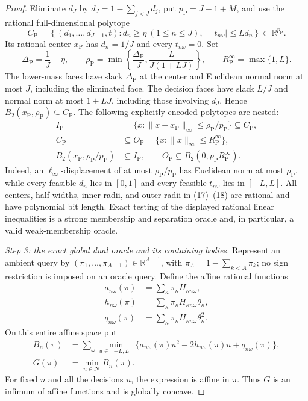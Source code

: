 \documentclass{article}
\begin{document}
\begin{proof}
Eliminate \(d_J\) by \(d_J=1-\sum_{j<J}d_j\), put \(p_{\mathrm P}=J-1+M\), and use the rational full-dimensional polytope
\[
 C_{\mathrm P}=\left\{(d_1,\ldots,d_{J-1},t):
 d_n\ge\eta\ (1\le n\le J),\quad
 |t_{n\omega}|\le Ld_n\right\}\subset\mathbb R^{p_{\mathrm P}}.
\tag{16}
\]
Its rational center \(x_{\mathrm P}\) has \(d_n=1/J\) and every \(t_{n\omega}=0\).  Set
\[
 \Delta_{\mathrm P}=\frac1J-\eta,
 \qquad
 \rho_{\mathrm P}=\min\left\{\frac{\Delta_{\mathrm P}}J,
                 \frac{L}{J(1+LJ)}\right\},
 \qquad R_{\mathrm P}^{\infty}=\max\{1,L\}.
\tag{17}
\]
The lower-mass faces have slack \(\Delta_{\mathrm P}\) at the center and Euclidean normal norm at most \(J\), including the eliminated face.  The decision faces have slack \(L/J\) and normal norm at most \(1+LJ\), including those involving \(d_J\).  Hence \(B_2(x_{\mathrm P},\rho_{\mathrm P})\subseteq C_{\mathrm P}\).  The following explicitly encoded polytopes are nested:
\[
 \begin{split}
 I_{\mathrm P}
   &=\{x:\|x-x_{\mathrm P}\|_\infty\le\rho_{\mathrm P}/p_{\mathrm P}\}
     \subseteq C_{\mathrm P},\\
 C_{\mathrm P}&\subseteq
 O_{\mathrm P}=\{x:\|x\|_\infty\le R_{\mathrm P}^{\infty}\},\\
 B_2(x_{\mathrm P},\rho_{\mathrm P}/p_{\mathrm P})
   &\subseteq I_{\mathrm P},
 \qquad
 O_{\mathrm P}\subseteq B_2(0,p_{\mathrm P}R_{\mathrm P}^{\infty}).
 \end{split}
\tag{18}
\]
Indeed, an \(\ell_\infty\)-displacement of at most \(\rho_{\mathrm P}/p_{\mathrm P}\) has Euclidean norm at most \(\rho_{\mathrm P}\), while every feasible \(d_n\) lies in \([0,1]\) and every feasible \(t_{n\omega}\) lies in \([-L,L]\).  All centers, half-widths, inner radii, and outer radii in (17)--(18) are rational and have polynomial bit length.  Exact testing of the displayed rational linear inequalities is a strong membership and separation oracle and, in particular, a valid weak-membership oracle.

\emph{Step 3: the exact global dual oracle and its containing bodies.}
Represent an ambient query by \((\pi_1,\ldots,\pi_{A-1})\in\mathbb R^{A-1}\), with \(\pi_A=1-\sum_{k<A}\pi_k\); no sign restriction is imposed on an oracle query.  Define the affine rational functions
\[
 \begin{split}
 a_{n\omega}(\pi)&=\sum_\kappa\pi_\kappa H_{\kappa n\omega},\\
 h_{n\omega}(\pi)&=\sum_\kappa\pi_\kappa H_{\kappa n\omega}\theta_\kappa,\\
 q_{n\omega}(\pi)&=\sum_\kappa\pi_\kappa H_{\kappa n\omega}\theta_\kappa^2.
 \end{split}
\tag{19}
\]
On this entire affine space put
\[
 \begin{split}
 B_n(\pi)&=\sum_\omega\min_{u\in[-L,L]}
 \{a_{n\omega}(\pi)u^2-2h_{n\omega}(\pi)u+q_{n\omega}(\pi)\},\\
 G(\pi)&=\min_{n\in\mathcal N}B_n(\pi).
 \end{split}
\tag{20}
\]
For fixed \(n\) and all the decisions \(u\), the expression is affine in \(\pi\).  Thus \(G\) is an infimum of affine functions and is globally concave.


\end{proof}
\end{document}
